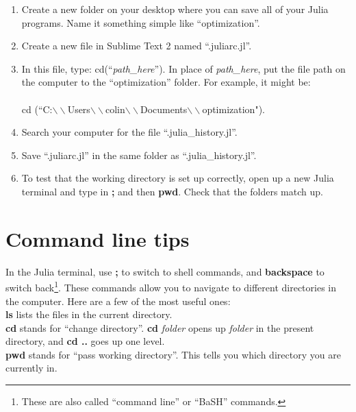 \documentclass[12pt]{article}
\begin{document}
\begin{enumerate}

\item Create a new folder on your desktop where you can save all of your Julia programs.  Name it something simple like ``optimization''.  

\item Create a new file in Sublime Text 2 named ``.juliarc.jl''.  

\item In this file, type: cd(``\emph{path\_here}'').  In place of \emph{path\_here}, put the file path on the computer to the ``optimization'' folder.  For example, it might be: \\\\
cd (``C:$\backslash\backslash$Users$\backslash\backslash$colin$\backslash\backslash$Documents$\backslash\backslash$optimization").  \\

\item Search your computer for the file ``.julia\_history.jl''.  

\item Save ``.juliarc.jl'' in the same folder as ``.julia\_history.jl''.   

\item To test that the working directory is set up correctly, open up a new Julia terminal and type in {\bf ;} and then {\bf pwd}.  Check that the folders match up.  

\end{enumerate}

\section{Command line tips}
In the Julia terminal, use {\bf ;} to switch to shell commands, and {\bf backspace} to switch back\footnote{These are also called ``command line'' or ``BaSH'' commands. }.  These commands allow you to navigate to different directories in the computer.   Here are a few of the most useful ones:\\

{\bf ls} lists the files in the current directory.  \\

{\bf cd} stands for ``change directory''.  {\bf cd} \emph{folder} opens up \emph{folder} in the present directory, and {\bf cd ..} goes up one level. \\

{\bf pwd} stands for ``pass working directory''.  This tells you which directory you are currently in.  \\
\end{document}
